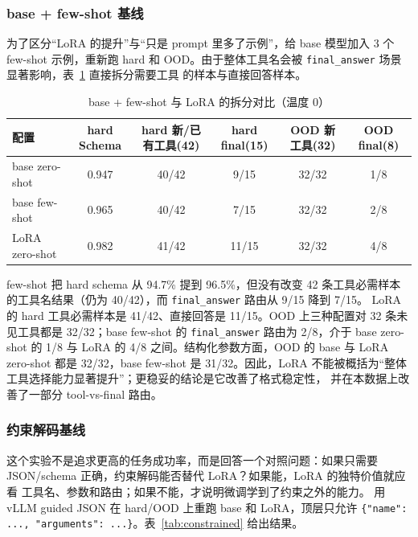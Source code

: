 \documentclass[UTF8,a4paper,12pt]{ctexart}
\begin{document}
\subsubsection{base + few-shot 基线}
为了区分“LoRA 的提升”与“只是 prompt 里多了示例”，给 base 模型加入
3 个 few-shot 示例，重新跑 hard 和 OOD。由于整体工具名会被
\texttt{final\_answer} 场景显著影响，表~\ref{tab:fewshot} 直接拆分需要工具
的样本与直接回答样本。

\begin{table}[H]
  \centering
  \small
  \caption{base + few-shot 与 LoRA 的拆分对比（温度 0）}
  \label{tab:fewshot}
  \begin{tabular}{lccccc}
    \toprule
    配置 & hard Schema & hard 新/已有工具(42) & hard final(15) & OOD 新工具(32) & OOD final(8) \\
    \midrule
    base zero-shot & 0.947 & 40/42 & 9/15 & 32/32 & 1/8 \\
    base few-shot & 0.965 & 40/42 & 7/15 & 32/32 & 2/8 \\
    LoRA zero-shot & 0.982 & 41/42 & 11/15 & 32/32 & 4/8 \\
    \bottomrule
  \end{tabular}
\end{table}

few-shot 把 hard schema 从 94.7\% 提到 96.5\%，但没有改变 42 条工具必需样本
的工具名结果（仍为 40/42），而 \texttt{final\_answer} 路由从 9/15 降到 7/15。
LoRA 的 hard 工具必需样本是 41/42、直接回答是 11/15。OOD 上三种配置对
32 条未见工具都是 32/32；base few-shot 的 \texttt{final\_answer} 路由为
2/8，介于 base zero-shot 的 1/8 与 LoRA 的 4/8 之间。结构化参数方面，OOD
的 base 与 LoRA zero-shot 都是 32/32，base few-shot 是 31/32。因此，LoRA
不能被概括为“整体工具选择能力显著提升”；更稳妥的结论是它改善了格式稳定性，
并在本数据上改善了一部分 tool-vs-final 路由。

\subsubsection{约束解码基线}
这个实验不是追求更高的任务成功率，而是回答一个对照问题：如果只需要
JSON/schema 正确，约束解码能否替代 LoRA？如果能，LoRA 的独特价值就应看
工具名、参数和路由；如果不能，才说明微调学到了约束之外的能力。
用 vLLM guided JSON 在 hard/OOD 上重跑 base 和 LoRA，顶层只允许
\texttt{\{"name": ..., "arguments": ...\}}。表~\ref{tab:constrained}
给出结果。
\end{document}
